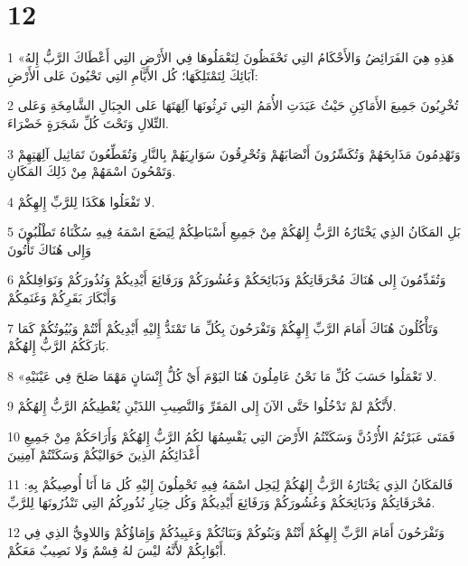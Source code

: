 \chapter{12}

\par 1 «هَذِهِ هِيَ الفَرَائِضُ وَالأَحْكَامُ التِي تَحْفَظُونَ لِتَعْمَلُوهَا فِي الأَرْضِ التِي أَعْطَاكَ الرَّبُّ إِلهُ آبَائِكَ لِتَمْتَلِكَهَا؛ كُل الأَيَّامِ التِي تَحْيُونَ عَلى الأَرْضِ:
\par 2 تُخْرِبُونَ جَمِيعَ الأَمَاكِنِ حَيْثُ عَبَدَتِ الأُمَمُ التِي تَرِثُونَهَا آلِهَتَهَا عَلى الجِبَالِ الشَّامِخَةِ وَعَلى التِّلالِ وَتَحْتَ كُلِّ شَجَرَةٍ خَضْرَاءَ.
\par 3 وَتَهْدِمُونَ مَذَابِحَهُمْ وَتُكَسِّرُونَ أَنْصَابَهُمْ وَتُحْرِقُونَ سَوَارِيَهُمْ بِالنَّارِ وَتُقَطِّعُونَ تَمَاثِيل آلِهَتِهِمْ وَتَمْحُونَ اسْمَهُمْ مِنْ ذَلِكَ المَكَانِ.
\par 4 لا تَفْعَلُوا هَكَذَا لِلرَّبِّ إِلهِكُمْ.
\par 5 بَلِ المَكَانُ الذِي يَخْتَارُهُ الرَّبُّ إِلهُكُمْ مِنْ جَمِيعِ أَسْبَاطِكُمْ لِيَضَعَ اسْمَهُ فِيهِ سُكْنَاهُ تَطْلُبُونَ وَإِلى هُنَاكَ تَأْتُونَ
\par 6 وَتُقَدِّمُونَ إِلى هُنَاكَ مُحْرَقَاتِكُمْ وَذَبَائِحَكُمْ وَعُشُورَكُمْ وَرَفَائِعَ أَيْدِيكُمْ وَنُذُورَكُمْ وَنَوَافِلكُمْ وَأَبْكَارَ بَقَرِكُمْ وَغَنَمِكُمْ
\par 7 وَتَأْكُلُونَ هُنَاكَ أَمَامَ الرَّبِّ إِلهِكُمْ وَتَفْرَحُونَ بِكُلِّ مَا تَمْتَدُّ إِليْهِ أَيْدِيكُمْ أَنْتُمْ وَبُيُوتُكُمْ كَمَا بَارَكَكُمُ الرَّبُّ إِلهُكُمْ.
\par 8 «لا تَعْمَلُوا حَسَبَ كُلِّ مَا نَحْنُ عَامِلُونَ هُنَا اليَوْمَ أَيْ كُلُّ إِنْسَانٍ مَهْمَا صَلحَ فِي عَيْنَيْهِ.
\par 9 لأَنَّكُمْ لمْ تَدْخُلُوا حَتَّى الآنَ إِلى المَقَرِّ وَالنَّصِيبِ اللذَيْنِ يُعْطِيكُمُ الرَّبُّ إِلهُكُمْ.
\par 10 فَمَتَى عَبَرْتُمُ الأُرْدُنَّ وَسَكَنْتُمُ الأَرْضَ التِي يَقْسِمُهَا لكُمُ الرَّبُّ إِلهُكُمْ وَأَرَاحَكُمْ مِنْ جَمِيعِ أَعْدَائِكُمُ الذِينَ حَوَاليْكُمْ وَسَكَنْتُمْ آمِنِينَ
\par 11 فَالمَكَانُ الذِي يَخْتَارُهُ الرَّبُّ إِلهُكُمْ لِيَحِل اسْمَهُ فِيهِ تَحْمِلُونَ إِليْهِ كُل مَا أَنَا أُوصِيكُمْ بِهِ: مُحْرَقَاتِكُمْ وَذَبَائِحَكُمْ وَعُشُورَكُمْ وَرَفَائِعَ أَيْدِيكُمْ وَكُل خِيَارِ نُذُورِكُمُ التِي تَنْذُرُونَهَا لِلرَّبِّ.
\par 12 وَتَفْرَحُونَ أَمَامَ الرَّبِّ إِلهِكُمْ أَنْتُمْ وَبَنُوكُمْ وَبَنَاتُكُمْ وَعَبِيدُكُمْ وَإِمَاؤُكُمْ وَاللاوِيُّ الذِي فِي أَبْوَابِكُمْ لأَنَّهُ ليْسَ لهُ قِسْمٌ وَلا نَصِيبٌ مَعَكُمْ.
